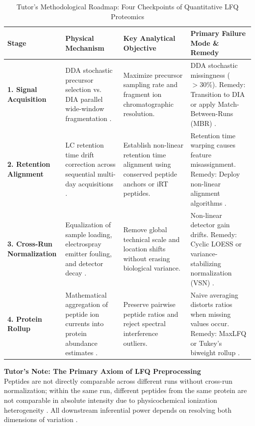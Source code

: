 \documentclass[11pt,oneside]{book}
\begin{document}
\begin{table}[ht]
\centering
\caption{Tutor's Methodological Roadmap: Four Checkpoints of Quantitative LFQ Proteomics}
\label{tab:lfq_roadmap}
\small
\begin{tabularx}{\textwidth}{l p{3.8cm} p{4.2cm} X}
\toprule
\textbf{Stage} & \textbf{Physical Mechanism} & \textbf{Key Analytical Objective} & \textbf{Primary Failure Mode \& Remedy} \\
\midrule
\textbf{1. Signal Acquisition} & DDA stochastic precursor selection vs. DIA parallel wide-window fragmentation \cite{gillet2012targeted, ludwig2018principles}. & Maximize precursor sampling rate and fragment ion chromatographic resolution. & DDA stochastic missingness ($>30\%$). Remedy: Transition to DIA or apply Match-Between-Runs (MBR) \cite{cox2014maxlfq}. \\
\addlinespace
\textbf{2. Retention Alignment} & LC retention time drift correction across sequential multi-day acquisitions \cite{escher2012using}. & Establish non-linear retention time alignment using conserved peptide anchors or iRT peptides. & Retention time warping causes feature misassignment. Remedy: Deploy non-linear alignment algorithms \cite{callister2006normalization}. \\
\addlinespace
\textbf{3. Cross-Run Normalization} & Equalization of sample loading, electrospray emitter fouling, and detector decay \cite{callister2006normalization, huber2002variance}. & Remove global technical scale and location shifts without erasing biological variance. & Non-linear detector gain drifts. Remedy: Cyclic LOESS or variance-stabilizing normalization (VSN) \cite{bolstad2003comparison}. \\
\addlinespace
\textbf{4. Protein Rollup} & Mathematical aggregation of peptide ion currents into protein abundance estimates \cite{cox2014maxlfq, silva2006absolute}. & Preserve pairwise peptide ratios and reject spectral interference outliers. & Naive averaging distorts ratios when missing values occur. Remedy: MaxLFQ or Tukey's biweight rollup \cite{gatto2023qfeatures}. \\
\bottomrule
\end{tabularx}
\end{table}

\begin{notebox}
\textbf{Tutor's Note: The Primary Axiom of LFQ Preprocessing}\\
Peptides are not directly comparable across different runs without cross-run normalization; within the same run, different peptides from the same protein are not comparable in absolute intensity due to physicochemical ionization heterogeneity \cite{silva2006absolute, aebersold2016mass}. All downstream inferential power depends on resolving both dimensions of variation \cite{navarro2016multicenter}.
\end{notebox}
\end{document}

